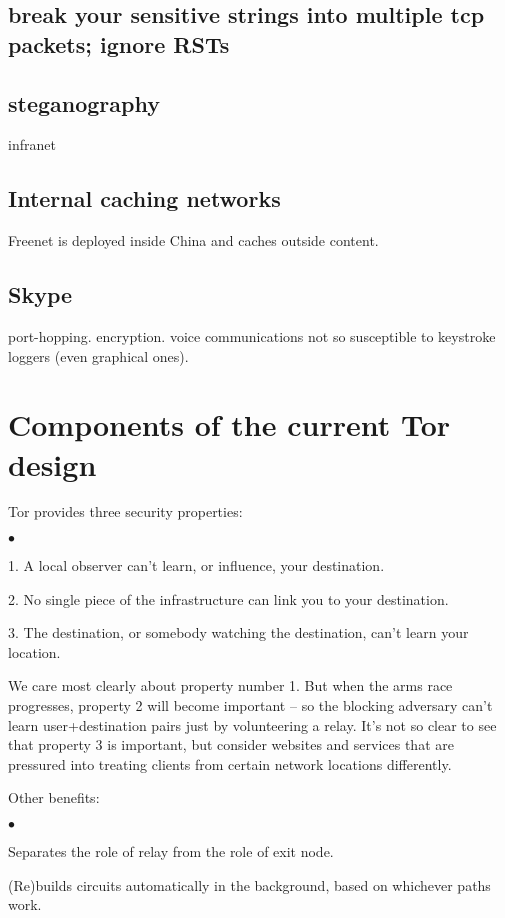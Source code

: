 \documentclass{llncs}
\newenvironment{tightlist}{\begin{list}{$\bullet$}{
  \setlength{\itemsep}{0mm}
    \setlength{\parsep}{0mm}
    }}{\end{list}}
\begin{document}
\subsection{break your sensitive strings into multiple tcp packets;
ignore RSTs}

\subsection{steganography}

infranet

\subsection{Internal caching networks}

Freenet is deployed inside China and caches outside content.

\subsection{Skype}

port-hopping. encryption. voice communications not so susceptible to
keystroke loggers (even graphical ones).

\section{Components of the current Tor design}

Tor provides three security properties:
\begin{tightlist}
\item 1. A local observer can't learn, or influence, your destination.
\item 2. No single piece of the infrastructure can link you to your
destination.
\item 3. The destination, or somebody watching the destination,
can't learn your location.
\end{tightlist}

We care most clearly about property number 1. But when the arms race
progresses, property 2 will become important -- so the blocking adversary
can't learn user+destination pairs just by volunteering a relay. It's not so
clear to see that property 3 is important, but consider websites and
services that are pressured into treating clients from certain network
locations differently.

Other benefits:

\begin{tightlist}
\item Separates the role of relay from the role of exit node.

\item (Re)builds circuits automatically in the background, based on
whichever paths work.
\end{tightlist}
\end{document}
